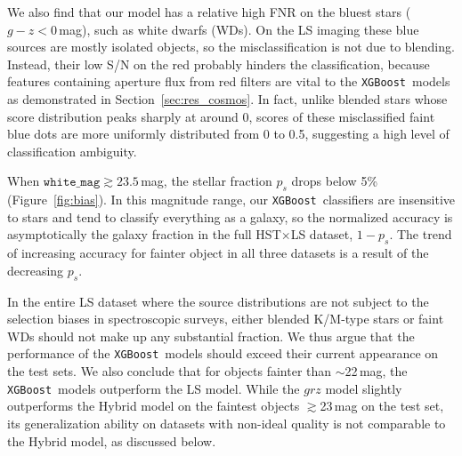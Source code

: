 \documentclass[twocolumn]{aastex631}
\newcommand{\xgboost}{\texttt{XGBoost}}
\begin{document}
\begin{CJK*}{UTF8}{gbsn}
We also find that our model has a relative high FNR on the bluest stars ($g-z<0$\,mag), such as white dwarfs (WDs). On the LS imaging these blue sources are mostly isolated objects, so the misclassification is not due to blending. Instead, their low S/N on the red probably hinders the classification, because features containing aperture flux from red filters are vital to the \xgboost\ models as demonstrated in Section~\ref{sec:res_cosmos}. In fact, unlike blended stars whose score distribution peaks sharply at around 0, scores of these misclassified faint blue dots are more uniformly distributed from 0 to 0.5, suggesting a high level of classification ambiguity. 

When $\texttt{white\_mag}\gtrsim 23.5$\,mag, the stellar fraction $p_s$ drops below 5\% (Figure~\ref{fig:bias}). In this magnitude range, our \xgboost\ classifiers are insensitive to stars and tend to classify everything as a galaxy, so the normalized accuracy is asymptotically the galaxy fraction in the full HST$\times$LS dataset, $1-p_s$. The trend of increasing accuracy for fainter object in all three datasets is a result of the decreasing $p_s$.

In the entire LS dataset where the source distributions are not subject to the selection biases in spectroscopic surveys, either blended K/M-type stars or faint WDs should not make up any substantial fraction. We thus argue that the performance of the \xgboost\ models should exceed their current appearance on the test sets. We also conclude that for objects fainter than $\sim$22\,mag, the \xgboost\ models outperform the LS model. While the $grz$ model slightly outperforms the Hybrid model on the faintest objects $\gtrsim$23\,mag on the test set, its generalization ability on datasets with non-ideal quality is not comparable to the Hybrid model, as discussed below.


\end{CJK*}
\end{document}
